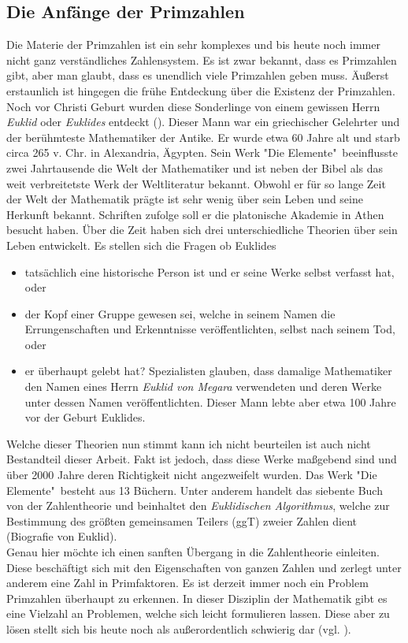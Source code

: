 \documentclass[german,12pt,a4paper]{article}
\begin{document}
\subsection{Die Anfänge der Primzahlen}
Die Materie der Primzahlen ist ein sehr komplexes und bis heute noch immer nicht ganz verständliches Zahlensystem. Es ist zwar bekannt, dass es Primzahlen gibt, aber man glaubt, dass es unendlich viele Primzahlen geben muss. Äußerst erstaunlich ist hingegen die frühe Entdeckung über die Existenz der Primzahlen. Noch vor Christi Geburt wurden diese Sonderlinge von einem gewissen Herrn \textit{Euklid} oder \textit{Euklides} entdeckt (\cite[22]{Remmert1995}). Dieser Mann war ein griechischer Gelehrter und der berühmteste Mathematiker der Antike. Er wurde etwa 60 Jahre alt und starb circa 265 v. Chr. in Alexandria, Ägypten. Sein Werk "Die Elemente"\ beeinflusste zwei Jahrtausende die Welt der Mathematiker und ist neben der Bibel als das weit verbreitetste Werk der Weltliteratur bekannt. Obwohl er für so lange Zeit der Welt der Mathematik prägte ist sehr wenig über sein Leben und seine Herkunft bekannt. Schriften zufolge soll er die platonische Akademie in Athen besucht haben. Über die Zeit haben sich drei unterschiedliche Theorien über sein Leben entwickelt. Es stellen sich die Fragen ob Euklides\
\begin{itemize}
\item tatsächlich eine historische Person ist und er seine Werke selbst verfasst hat, oder
\item der Kopf einer Gruppe gewesen sei, welche in seinem Namen die Errungenschaften und Erkenntnisse veröffentlichten, selbst nach seinem Tod, oder
\item er überhaupt gelebt hat? Spezialisten glauben, dass damalige Mathematiker den Namen eines Herrn \textit{Euklid von Megara} verwendeten und deren Werke unter dessen Namen veröffentlichten. Dieser Mann lebte aber etwa 100 Jahre vor der Geburt Euklides.
\end{itemize}
Welche dieser Theorien nun stimmt kann ich nicht beurteilen ist auch nicht Bestandteil dieser Arbeit. Fakt ist jedoch, dass diese Werke maßgebend sind und über 2000 Jahre deren Richtigkeit nicht angezweifelt wurden. Das Werk  "Die Elemente"\ besteht aus 13 Büchern. Unter anderem handelt das siebente Buch von der Zahlentheorie und beinhaltet den \textit{Euklidischen Algorithmus}, welche zur Bestimmung des größten gemeinsamen Teilers (ggT) zweier Zahlen dient (Biografie von Euklid).\\
Genau hier möchte ich einen sanften Übergang in die Zahlentheorie einleiten. Diese beschäftigt sich mit den Eigenschaften von ganzen Zahlen und zerlegt unter anderem eine Zahl in Primfaktoren. Es ist derzeit immer noch ein Problem Primzahlen überhaupt zu erkennen. In dieser Disziplin der Mathematik gibt es eine Vielzahl an Problemen, welche sich leicht formulieren lassen. Diese aber zu lösen stellt sich bis heute noch als außerordentlich schwierig dar (vgl. \cite[13]{Pomerance1996}).
\end{document}
